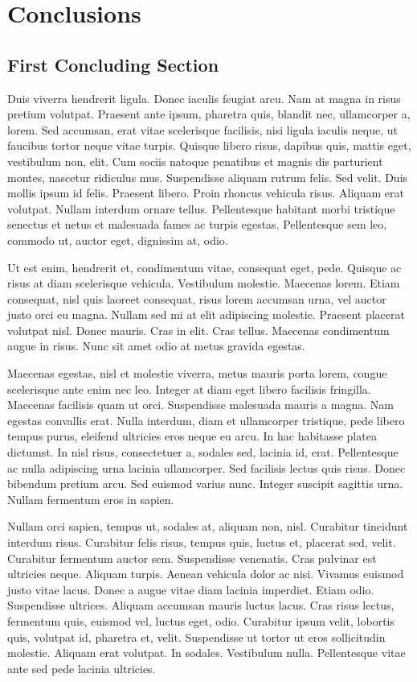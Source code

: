 \chapter{Conclusions}

\section{First Concluding Section}
Duis viverra hendrerit ligula. Donec iaculis feugiat arcu. Nam at magna in risus pretium volutpat. Praesent ante ipsum, pharetra quis, blandit nec, ullamcorper a, lorem. Sed accumsan, erat vitae scelerisque facilisis, nisi ligula iaculis neque, ut faucibus tortor neque vitae turpis. Quisque libero risus, dapibus quis, mattis eget, vestibulum non, elit. Cum sociis natoque penatibus et magnis dis parturient montes, nascetur ridiculus mus. Suspendisse aliquam rutrum felis. Sed velit. Duis mollis ipsum id felis. Praesent libero. Proin rhoncus vehicula risus. Aliquam erat volutpat. Nullam interdum ornare tellus. Pellentesque habitant morbi tristique senectus et netus et malesuada fames ac turpis egestas. Pellentesque sem leo, commodo ut, auctor eget, dignissim at, odio.

Ut est enim, hendrerit et, condimentum vitae, consequat eget, pede. Quisque ac risus at diam scelerisque vehicula. Vestibulum molestie. Maecenas lorem. Etiam consequat, nisl quis laoreet consequat, risus lorem accumsan urna, vel auctor justo orci eu magna. Nullam sed mi at elit adipiscing molestie. Praesent placerat volutpat nisl. Donec mauris. Cras in elit. Cras tellus. Maecenas condimentum augue in risus. Nunc sit amet odio at metus gravida egestas.

Maecenas egestas, nisl et molestie viverra, metus mauris porta lorem, congue scelerisque ante enim nec leo. Integer at diam eget libero facilisis fringilla. Maecenas facilisis quam ut orci. Suspendisse malesuada mauris a magna. Nam egestas convallis erat. Nulla interdum, diam et ullamcorper tristique, pede libero tempus purus, eleifend ultricies eros neque eu arcu. In hac habitasse platea dictumst. In nisl risus, consectetuer a, sodales sed, lacinia id, erat. Pellentesque ac nulla adipiscing urna lacinia ullamcorper. Sed facilisis lectus quis risus. Donec bibendum pretium arcu. Sed euismod varius nunc. Integer suscipit sagittis urna. Nullam fermentum eros in sapien.

Nullam orci sapien, tempus ut, sodales at, aliquam non, nisl. Curabitur tincidunt interdum risus. Curabitur felis risus, tempus quis, luctus et, placerat sed, velit. Curabitur fermentum auctor sem. Suspendisse venenatis. Cras pulvinar est ultricies neque. Aliquam turpis. Aenean vehicula dolor ac nisi. Vivamus euismod justo vitae lacus. Donec a augue vitae diam lacinia imperdiet. Etiam odio. Suspendisse ultrices. Aliquam accumsan mauris luctus lacus. Cras risus lectus, fermentum quis, euismod vel, luctus eget, odio. Curabitur ipsum velit, lobortis quis, volutpat id, pharetra et, velit. Suspendisse ut tortor ut eros sollicitudin molestie. Aliquam erat volutpat. In sodales. Vestibulum nulla. Pellentesque vitae ante sed pede lacinia ultricies.

